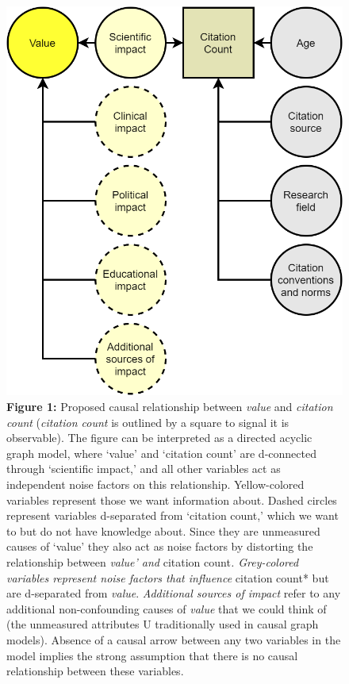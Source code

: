 \documentclass[
  english,
  jou,floatsintext]{apa6}
\begin{document}
\begin{figure}
\centering
\includegraphics{figure_1.png}
\caption{\textbf{Figure 1:} Proposed causal relationship between \emph{value} and \emph{citation count} (\emph{citation count} is outlined by a square to signal it is observable). The figure can be interpreted as a directed acyclic graph model, where `value' and `citation count' are d-connected through `scientific impact,' and all other variables act as independent noise factors on this relationship. Yellow-colored variables represent those we want information about. Dashed circles represent variables d-separated from `citation count,' which we want to but do not have knowledge about. Since they are unmeasured causes of `value' they also act as noise factors by distorting the relationship between \emph{value' and }citation count\emph{. Grey-colored variables represent noise factors that influence }citation count* but are d-separated from \emph{value}. \emph{Additional sources of impact} refer to any additional non-confounding causes of \emph{value} that we could think of (the unmeasured attributes U traditionally used in causal graph models). Absence of a causal arrow between any two variables in the model implies the strong assumption that there is no causal relationship between these variables. \label{fig:1}}
\end{figure}
\end{document}
